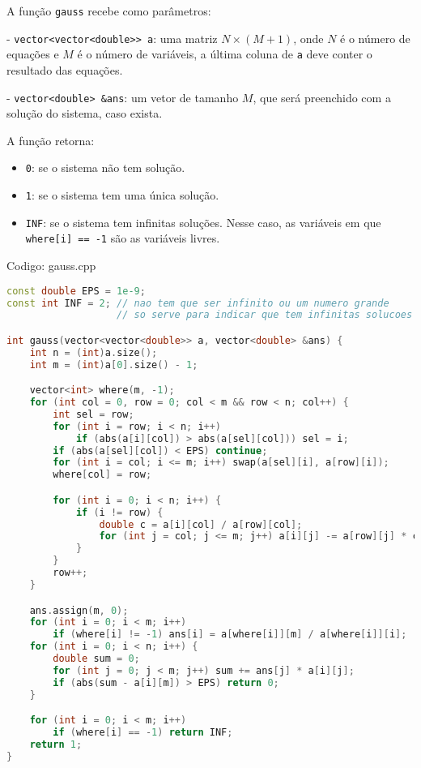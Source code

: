 \documentclass[10pt, a4paper, oneside]{book}
\begin{document}
A função \texttt{gauss} recebe como parâmetros:

 - \texttt{vector<vector<double>> a}: uma matriz $N \times (M + 1)$, onde $N$ é o número de equações e $M$ é o número de variáveis, a última coluna de \texttt{a} deve conter o resultado das equações.

 - \texttt{vector<double> \&ans}: um vetor de tamanho $M$, que será preenchido com a solução do sistema, caso exista.



A função retorna:

\begin{itemize}
\item \texttt{0}: se o sistema não tem solução.
\item \texttt{1}: se o sistema tem uma única solução.
\item \texttt{INF}: se o sistema tem infinitas soluções. Nesse caso, as variáveis em que \texttt{where[i] == -1} são as variáveis livres.
\end{itemize}

\hfill

Codigo: gauss.cpp

\begin{lstlisting}[language=C++]
const double EPS = 1e-9;
const int INF = 2; // nao tem que ser infinito ou um numero grande
                   // so serve para indicar que tem infinitas solucoes

int gauss(vector<vector<double>> a, vector<double> &ans) {
    int n = (int)a.size();
    int m = (int)a[0].size() - 1;

    vector<int> where(m, -1);
    for (int col = 0, row = 0; col < m && row < n; col++) {
        int sel = row;
        for (int i = row; i < n; i++)
            if (abs(a[i][col]) > abs(a[sel][col])) sel = i;
        if (abs(a[sel][col]) < EPS) continue;
        for (int i = col; i <= m; i++) swap(a[sel][i], a[row][i]);
        where[col] = row;

        for (int i = 0; i < n; i++) {
            if (i != row) {
                double c = a[i][col] / a[row][col];
                for (int j = col; j <= m; j++) a[i][j] -= a[row][j] * c;
            }
        }
        row++;
    }

    ans.assign(m, 0);
    for (int i = 0; i < m; i++)
        if (where[i] != -1) ans[i] = a[where[i]][m] / a[where[i]][i];
    for (int i = 0; i < n; i++) {
        double sum = 0;
        for (int j = 0; j < m; j++) sum += ans[j] * a[i][j];
        if (abs(sum - a[i][m]) > EPS) return 0;
    }

    for (int i = 0; i < m; i++)
        if (where[i] == -1) return INF;
    return 1;
}
\end{lstlisting}
\hfill
\end{document}

